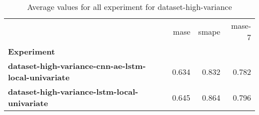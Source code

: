 \begin{table}[h]
\centering
\caption{Average values for all experiment for dataset-high-variance}
\label{table:Average-metric-dataset-high-variance}
\begin{tabular}{lrrr}
\toprule
{} &   mase &  smape &  mase-7 \\
\textbf{Experiment                                        } &        &        &         \\
\midrule
\textbf{dataset-high-variance-cnn-ae-lstm-local-univariate} &  0.634 &  0.832 &   0.782 \\
\textbf{dataset-high-variance-lstm-local-univariate       } &  0.645 &  0.864 &   0.796 \\
\bottomrule
\end{tabular}
\end{table}
